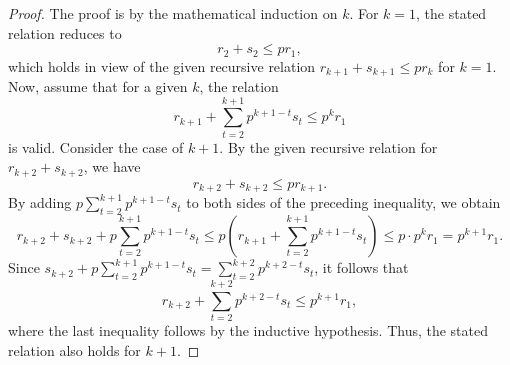 \documentclass{article}
\theoremstyle{plain}
\theoremstyle{definition}
\theoremstyle{remark}
\begin{document}
\begin{proof}
The proof is by the mathematical induction on $k$. For $k=1$, the stated relation reduces to 
\[r_2+s_2\le p r_1,\]
which holds in view of the given recursive relation 
$r_{k+1}+s_{k+1}\le p r_k$ for $k=1$.
Now, assume that 
for a given $k$, the relation
\[r_{k+1} + \sum_{t=2}^{k+1} p^{k+1-t} s_t\le p^k r_1\]
is valid. Consider the case of $k+1$. By the 
given recursive relation for $r_{k+2}+s_{k+2}$, we have
\[r_{k+2}+s_{k+2}\le p r_{k+1}.\]
By adding $p\sum_{t=2}^{k+1} p^{k+1-t} s_t$ 
to both sides of the preceding inequality, we obtain
\[r_{k+2}+s_{k+2} +p\sum_{t=2}^{k+1} p^{k+1-t} s_t
\le p \left(r_{k+1} +\sum_{t=2}^{k+1} p^{k+1-t} s_t\right)
\le p\cdot p^k r_1=p^{k+1}r_1.\]
Since $s_{k+2} +p\sum_{t=2}^{k+1} p^{k+1-t} s_t=\sum_{t=2}^{k+2} p^{k+2-t}s_t$, it follows that 
\[r_{k+2}+\sum_{t=2}^{k+2} p^{k+2-t}s_t\le p^{k+1}r_1,\]
where the last inequality follows by the inductive hypothesis.
Thus, the stated relation also holds for $k+1$.
\end{proof}

\end{document}

